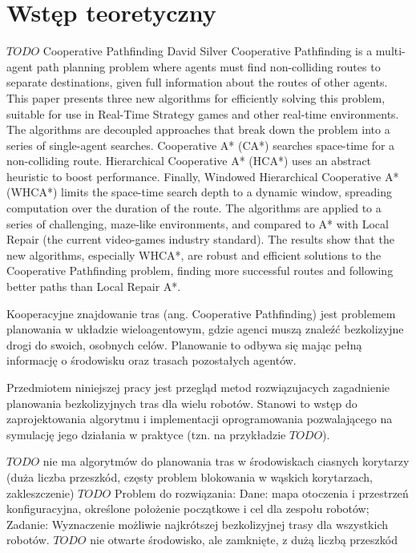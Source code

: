 \chapter{Wstęp teoretyczny}
\label{ch:wstept}

$TODO$
Cooperative Pathfinding
David Silver
Cooperative Pathfinding is a multi-agent path planning problem where agents must find non-colliding routes to separate destinations, given full information about the routes of other agents. This paper presents three new algorithms for efficiently solving this problem, suitable for use in Real-Time Strategy games and other real-time environments. The algorithms are decoupled approaches that break down the problem into a series of single-agent searches. Cooperative A* (CA*) searches space-time for a non-colliding route. Hierarchical Cooperative A* (HCA*) uses an abstract heuristic to boost performance. Finally, Windowed Hierarchical Cooperative A* (WHCA*) limits the space-time search depth to a dynamic window, spreading computation over the duration of the route. The algorithms are applied to a series of challenging, maze-like environments, and compared to A* with Local Repair (the current video-games industry standard). The results show that the new algorithms, especially WHCA*, are robust and efficient solutions to the Cooperative Pathfinding problem, finding more successful routes and following better paths than Local Repair A*.

Kooperacyjne znajdowanie tras (ang. Cooperative Pathfinding) jest problemem planowania w układzie wieloagentowym, gdzie agenci muszą znaleźć bezkolizyjne drogi do swoich, osobnych celów. Planowanie to odbywa się mając pełną informację o środowisku oraz trasach pozostałych agentów. 


Przedmiotem niniejszej pracy jest przegląd metod rozwiązujacych zagadnienie planowania bezkolizyjnych tras dla wielu robotów. Stanowi to wstęp do zaprojektowania algorytmu i implementacji oprogramowania pozwalającego na symulację jego działania w praktyce (tzn. na przykładzie $TODO$).

$TODO$ nie ma algorytmów do planowania tras w środowiskach ciasnych korytarzy (duża liczba przeszkód, częsty problem blokowania w wąskich korytarzach, zakleszczenie)
$TODO$ Problem do rozwiązania: Dane: mapa otoczenia i przestrzeń konfiguracyjna, określone położenie początkowe i cel dla zespołu robotów; Zadanie: Wyznaczenie możliwie najkrótszej bezkolizyjnej trasy dla wszystkich robotów.
$TODO$ nie otwarte środowisko, ale zamknięte, z dużą liczbą przeszkód

